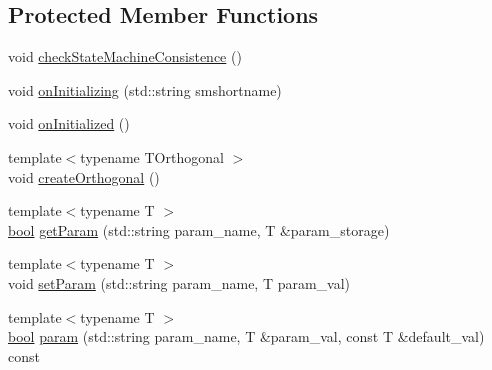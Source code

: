 \subsection*{Protected Member Functions}
\begin{DoxyCompactItemize}
\item 
void \hyperlink{classsmacc_1_1ISmaccStateMachine_af34fa8346ae3f52882704422d59b9055}{check\+State\+Machine\+Consistence} ()
\item 
void \hyperlink{classsmacc_1_1ISmaccStateMachine_ae8c9c79ca6cd77c975f5d9cda33a6d5e}{on\+Initializing} (std\+::string smshortname)
\item 
void \hyperlink{classsmacc_1_1ISmaccStateMachine_a95e7f71d0d88fffd0afebb1f9ccdade5}{on\+Initialized} ()
\item 
{\footnotesize template$<$typename T\+Orthogonal $>$ }\\void \hyperlink{classsmacc_1_1ISmaccStateMachine_a9155cf3d1877255d70b0bd71648734a3}{create\+Orthogonal} ()
\item 
{\footnotesize template$<$typename T $>$ }\\\hyperlink{classbool}{bool} \hyperlink{classsmacc_1_1ISmaccStateMachine_ac9fda4abe36f62db5ae231289afa4665}{get\+Param} (std\+::string param\+\_\+name, T \&param\+\_\+storage)
\item 
{\footnotesize template$<$typename T $>$ }\\void \hyperlink{classsmacc_1_1ISmaccStateMachine_afc730437f45fa107292c078dfab2aa37}{set\+Param} (std\+::string param\+\_\+name, T param\+\_\+val)
\item 
{\footnotesize template$<$typename T $>$ }\\\hyperlink{classbool}{bool} \hyperlink{classsmacc_1_1ISmaccStateMachine_a5c8c2c09423e321a46567a671d18d8e4}{param} (std\+::string param\+\_\+name, T \&param\+\_\+val, const T \&default\+\_\+val) const 
\end{DoxyCompactItemize}
